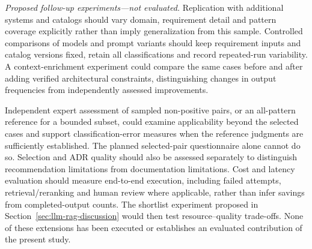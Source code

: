 \emph{Proposed follow-up experiments---not evaluated.}
Replication with additional systems and catalogs should vary domain,
requirement detail and pattern coverage explicitly rather than imply
generalization from this sample. Controlled comparisons of models and
prompt variants should keep requirement inputs and catalog versions
fixed, retain all classifications and record repeated-run variability.
A context-enrichment experiment could compare the same cases before
and after adding verified architectural constraints, distinguishing
changes in output frequencies from independently assessed improvements.

Independent expert assessment of sampled non-positive pairs, or an
all-pattern reference for a bounded subset, could examine applicability
beyond the selected cases and support classification-error measures
when the reference judgments are sufficiently established. The planned
selected-pair questionnaire alone cannot do so. Selection and ADR quality
should also be assessed separately to distinguish recommendation
limitations from documentation limitations.
Cost and latency evaluation should measure end-to-end execution,
including failed attempts, retrieval/reranking and human review where
applicable, rather than infer savings from completed-output counts.
The shortlist experiment proposed in
Section~\ref{sec:llm-rag-discussion} would then test resource--quality
trade-offs. None of these extensions has been executed or establishes
an evaluated contribution of the present study.
